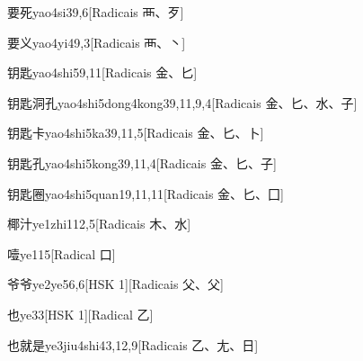\begin{entry}{要死}{yao4si3}{9,6}[Radicais ⾑、⽍]
\end{entry}

\begin{entry}{要义}{yao4yi4}{9,3}[Radicais ⾑、⼂]
\end{entry}

\begin{entry}{钥匙}{yao4shi5}{9,11}[Radicais ⾦、⼔]
\end{entry}

\begin{entry}{钥匙洞孔}{yao4shi5dong4kong3}{9,11,9,4}[Radicais ⾦、⼔、⽔、⼦]
\end{entry}

\begin{entry}{钥匙卡}{yao4shi5ka3}{9,11,5}[Radicais ⾦、⼔、⼘]
\end{entry}

\begin{entry}{钥匙孔}{yao4shi5kong3}{9,11,4}[Radicais ⾦、⼔、⼦]
\end{entry}

\begin{entry}{钥匙圈}{yao4shi5quan1}{9,11,11}[Radicais ⾦、⼔、⼞]
\end{entry}

\begin{entry}{椰汁}{ye1zhi1}{12,5}[Radicais ⽊、⽔]
\end{entry}

\begin{entry}{噎}{ye1}{15}[Radical ⼝]
\end{entry}

\begin{entry}{爷爷}{ye2ye5}{6,6}[HSK 1][Radicais ⽗、⽗]
\end{entry}

\begin{entry}{也}{ye3}{3}[HSK 1][Radical ⼄]
\end{entry}

\begin{entry}{也就是}{ye3jiu4shi4}{3,12,9}[Radicais ⼄、⼪、⽇]
\end{entry}

